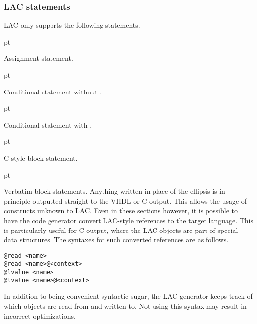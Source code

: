
\subsubsection{LAC statements}
\label{sec:core-ug-cfg-cregs-stmts}

LAC only supports the following statements.

 pt

\noindent Assignment statement.

 pt

\noindent Conditional statement without .

 pt

\noindent Conditional statement with .

 pt

\noindent C-style block statement.

 pt


\noindent Verbatim block statements. Anything written in place of the ellipsis 
is in principle outputted straight to the VHDL or C output. This allows the 
usage of constructs unknown to LAC. Even in these sections however, it is 
possible to have the code generator convert LAC-style references to the target 
language. This is particularly useful for C output, where the LAC objects are 
part of special data structures. The syntaxes for such converted references are 
as follows.

\begin{lstlisting}[numbers=none, language=nothing]
@read <name>
@read <name>@<context>
@lvalue <name>
@lvalue <name>@<context>
\end{lstlisting}

\noindent In addition to being convenient syntactic sugar, the LAC generator 
keeps track of which objects are read from and written to. Not using this syntax 
may result in incorrect optimizations.

